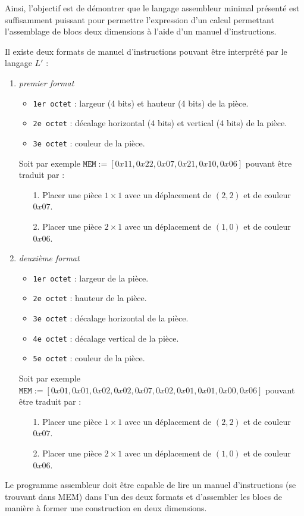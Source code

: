 \noindent
Ainsi, l'objectif est de démontrer que le langage assembleur minimal 
présenté est suffisamment puissant pour permettre l'expression d'un 
calcul permettant l'assemblage de blocs deux dimensions à l'aide d'un 
manuel d'instructions.
\medskip

\noindent
Il existe deux formats de manuel d'instructions pouvant être 
interprété par le langage $L'$ :
\begin{enumerate}
  \item \emph{premier format}
    \begin{itemize}
      \item \texttt{1er octet} : largeur (4 bits) et hauteur (4 bits) 
        de la pièce.
      \item \texttt{2e octet} : décalage horizontal (4 bits) et 
        vertical (4 bits) de la pièce.
      \item \texttt{3e octet} : couleur de la pièce.
    \end{itemize}
    Soit par exemple $\texttt{MEM} {:=} [0x11, 0x22, 0x07, 0x21, 0x10, 
    0x06]$ pouvant être traduit par :
    \begin{enumerate}
      \item[1.] Placer une pièce $1 \times 1$ avec un déplacement de 
          $(2, 2)$ et de couleur $0x07$.
      \item [2.] Placer une pièce $2 \times 1$ avec un déplacement de 
          $(1, 0)$ et de couleur $0x06$.
    \end{enumerate}
  \item \emph{deuxième format}
    \begin{itemize}
      \item \texttt{1er octet} : largeur de la pièce.
      \item \texttt{2e octet} : hauteur de la pièce.
      \item \texttt{3e octet} : décalage horizontal de la pièce.
      \item \texttt{4e octet} : décalage vertical de la pièce.
      \item \texttt{5e octet} : couleur de la pièce.
    \end{itemize}
    Soit par exemple $\texttt{MEM} {:=} [0x01, 0x01, 0x02, 0x02, 0x07, 
    0x02, 0x01, 0x01, 0x00, 0x06]$ pouvant être traduit par :
    \begin{enumerate}
      \item[1.] Placer une pièce $1 \times 1$ avec un déplacement de 
          $(2, 2)$ et de couleur $0x07$.
      \item [2.] Placer une pièce $2 \times 1$ avec un déplacement de 
          $(1, 0)$ et de couleur $0x06$.
    \end{enumerate}
\end{enumerate}
Le programme assembleur doit être capable de lire un manuel 
d'instructions (se trouvant dans MEM) dans l'un des deux formats et 
d'assembler les blocs de manière à former une construction en deux 
dimensions.
\medskip

